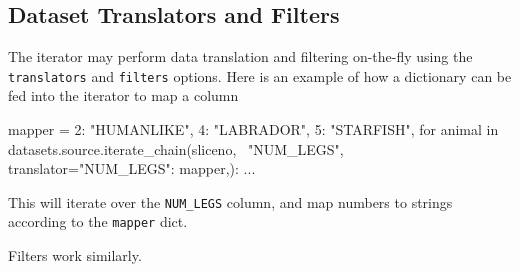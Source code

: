 \subsection{Dataset Translators and Filters}

The iterator may perform data translation and filtering on-the-fly
using the \texttt{translators} and \texttt{filters} options.  Here is
an example of how a dictionary can be fed into the iterator to map a
column
\begin{python}
mapper = {2: "HUMANLIKE", 4: "LABRADOR", 5: "STARFISH",}
for animal in datasets.source.iterate_chain(sliceno, \
  "NUM_LEGS", translator={"NUM_LEGS": mapper,}):
    ...
\end{python}
This will iterate over the \texttt{NUM\_LEGS} column, and map numbers
to strings according to the \texttt{mapper} dict.

Filters work similarly.

